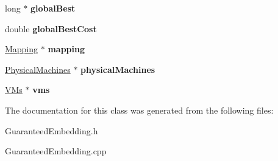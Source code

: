 \begin{DoxyCompactItemize}
\item 
\hypertarget{classGuaranteedEmbedding_ab163af36461ccd169aef2ed30f1fdce8}{long $\ast$ {\bfseries global\-Best}}\label{classGuaranteedEmbedding_ab163af36461ccd169aef2ed30f1fdce8}

\item 
\hypertarget{classGuaranteedEmbedding_a8f2dd00baaabf211fec6e07a9c0f78cd}{double {\bfseries global\-Best\-Cost}}\label{classGuaranteedEmbedding_a8f2dd00baaabf211fec6e07a9c0f78cd}

\item 
\hypertarget{classGuaranteedEmbedding_a8e78de4dea22ef9580b9210a7cd55635}{\hyperlink{classMapping}{\-Mapping} $\ast$ {\bfseries mapping}}\label{classGuaranteedEmbedding_a8e78de4dea22ef9580b9210a7cd55635}

\item 
\hypertarget{classGuaranteedEmbedding_ac1fc1081db62d869e6795cdd394f3af3}{\hyperlink{classPhysicalMachines}{\-Physical\-Machines} $\ast$ {\bfseries physical\-Machines}}\label{classGuaranteedEmbedding_ac1fc1081db62d869e6795cdd394f3af3}

\item 
\hypertarget{classGuaranteedEmbedding_ad83affd2725bd5ea76fe97d06afcee7a}{\hyperlink{classVMs}{\-V\-Ms} $\ast$ {\bfseries vms}}\label{classGuaranteedEmbedding_ad83affd2725bd5ea76fe97d06afcee7a}

\end{DoxyCompactItemize}


\-The documentation for this class was generated from the following files\-:\begin{DoxyCompactItemize}
\item 
\-Guaranteed\-Embedding.\-h\item 
\-Guaranteed\-Embedding.\-cpp\end{DoxyCompactItemize}
